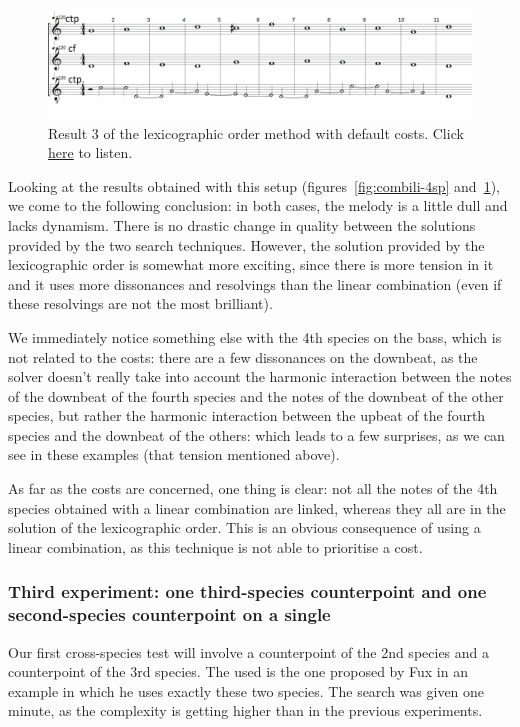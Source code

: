 \begin{figure}[h]
    \centering
    \includegraphics[width=1\textwidth]{Images/Experiments/basic-lexico-4sp.png}
    \caption{Result 3 of the lexicographic order method with default costs. Click \href{https://youtu.be/rh3YdRu62J4}{here} to listen.}
    \label{fig:lexico-4sp}
\end{figure}
Looking at the results obtained with this setup (figures~\ref{fig:combili-4sp} and~\ref{fig:lexico-4sp}), we come to the following conclusion: in both cases, the melody is a little dull and lacks dynamism. There is no drastic change in quality between the solutions provided by the two search techniques. However, the solution provided by the lexicographic order is somewhat more exciting, since there is more tension in it and it uses more dissonances and resolvings than the linear combination (even if these resolvings are not the most brilliant).

We immediately notice something else with the 4th species on the bass, which is not related to the costs: there are a few dissonances on the downbeat, as the solver doesn't really take into account the harmonic interaction between the notes of the downbeat of the fourth species and the notes of the downbeat of the other species, but rather the harmonic interaction between the upbeat of the fourth species and the downbeat of the others: which leads to a few surprises, as we can see in these examples (that tension mentioned above).

As far as the costs are concerned, one thing is clear: not all the notes of the 4th species obtained with a linear combination are linked, whereas they all are in the solution of the lexicographic order. This is an obvious consequence of using a linear combination, as this technique is not able to prioritise a cost.


\subsubsection{Third experiment: one third-species counterpoint and one second-species counterpoint on a single \cf}
Our first cross-species test will involve a counterpoint of the 2nd species and a counterpoint of the 3rd species. The \cfs used is the one proposed by Fux in an example in which he uses exactly these two species. The search was given one minute, as the complexity is getting higher than in the previous experiments. \label{subsection:third-experiment-with-costs}


